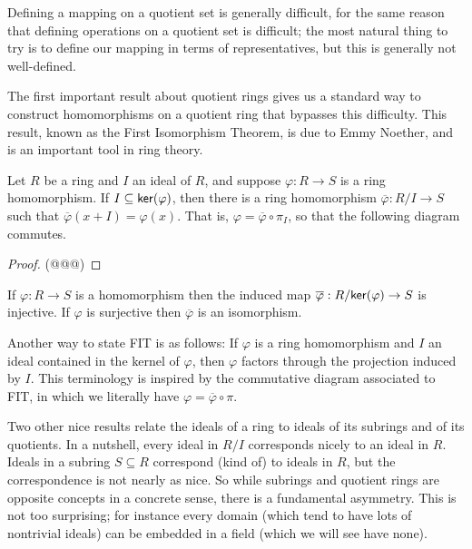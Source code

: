 Defining a mapping on a quotient set is generally difficult, for the same reason that defining operations on a quotient set is difficult; the most natural thing to try is to define our mapping in terms of representatives, but this is generally not well-defined.

The first important result about quotient rings gives us a standard way to construct homomorphisms on a quotient ring that bypasses this difficulty. This result, known as the First Isomorphism Theorem, is due to Emmy Noether, and is an important tool in ring theory.

\begin{prop}
Let \(R\) be a ring and \(I\) an ideal of \(R\), and suppose \(\varphi : R \rightarrow S\) is a ring homomorphism. If \(I \subseteq  \mathsf{ker}(\varphi) \), then there is a ring homomorphism \(\overline{\varphi} : R/I \rightarrow S\) such that \(\overline{\varphi}(x + I) = \varphi(x)\). That is, \(\varphi = \overline{\varphi} \circ \pi_I\), so that the following diagram commutes.
\begin{center}
\end{center}
\end{prop}

\begin{proof}
(@@@)
\end{proof}

\begin{cor}
If \(\varphi : R \rightarrow S\) is a homomorphism then the induced map \(\overline{\varphi} : R/ \mathsf{ker}(\varphi)  \rightarrow S\) is injective. If \(\varphi\) is surjective then \(\overline{\varphi}\) is an isomorphism.
\end{cor}

Another way to state FIT is as follows: If \(\varphi\) is a ring homomorphism and \(I\) an ideal contained in the kernel of \(\varphi\), then \(\varphi\) factors through the projection induced by \(I\). This terminology is inspired by the commutative diagram associated to FIT, in which we literally have \(\varphi = \overline{\varphi} \circ \pi\).

Two other nice results relate the ideals of a ring to ideals of its subrings and of its quotients. In a nutshell, every ideal in \(R/I\) corresponds nicely to an ideal in \(R\). Ideals in a subring \(S \subseteq R\) correspond (kind of) to ideals in \(R\), but the correspondence is not nearly as nice. So while subrings and quotient rings are opposite concepts in a concrete sense, there is a fundamental asymmetry. This is not too surprising; for instance every domain (which tend to have lots of nontrivial ideals) can be embedded in a field (which we will see have none).

